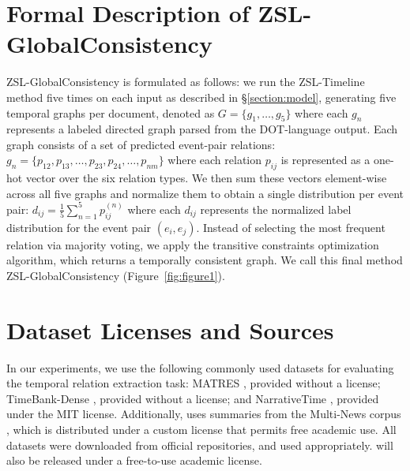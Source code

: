 \section{Formal Description of ZSL-GlobalConsistency}
\label{appx:formal-zsl-global}
ZSL-GlobalConsistency is formulated as follows: we run the ZSL-Timeline method five times on each input as described in §\ref{section:model}, generating five temporal graphs per document, denoted as  
\(
G = \{g_1, \dots, g_5\}
\)
where each \( g_n \) represents a labeled directed graph parsed from the DOT-language output. Each graph consists of a set of predicted event-pair relations:  
\(
g_n = \{p_{12}, p_{13}, \dots, p_{23}, p_{24}, \dots, p_{nm}\}
\)
where each relation \( p_{ij} \) is represented as a one-hot vector over the six relation types. We then sum these vectors element-wise across all five graphs and normalize them to obtain a single distribution per event pair:  
\(
d_{ij} = \frac{1}{5} \sum_{n=1}^{5} p_{ij}^{(n)}
\)
where each \( d_{ij} \) represents the normalized label distribution for the event pair \( (e_i, e_j) \). Instead of selecting the most frequent relation via majority voting, we apply the transitive constraints optimization algorithm, which returns a temporally consistent graph. We call this final method ZSL-GlobalConsistency (Figure~\ref{fig:figure1}).  



\section{Dataset Licenses and Sources}
In our experiments, we use the following commonly used datasets for evaluating the temporal relation extraction task: MATRES \cite{ning-etal-2018-multi}, provided without a license; TimeBank-Dense \cite{chambers-etal-2014-dense}, provided without a license; and NarrativeTime \cite{rogers-etal-2024-narrativetime}, provided under the MIT license. 
Additionally, \App{} uses summaries from the Multi-News corpus \cite{fabbri-etal-2019-multi}, which is distributed under a custom license that permits free academic use.
All datasets were downloaded from official repositories, and used appropriately. \App{} will also be released under a free-to-use academic license.


